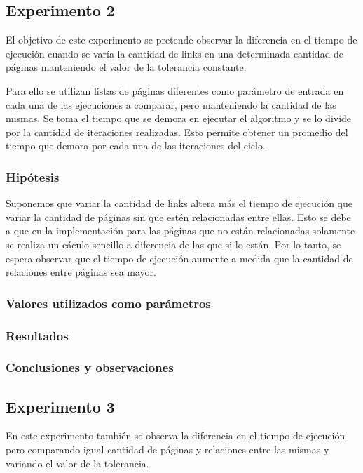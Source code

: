 	\subsection{Experimento 2}
	El objetivo de este experimento se pretende observar la diferencia en el tiempo de ejecución cuando se varía la cantidad de links en una determinada cantidad de páginas manteniendo el valor de la tolerancia constante.

	Para ello se utilizan listas de páginas diferentes como parámetro de entrada en cada una de las ejecuciones a comparar, pero manteniendo la cantidad de las mismas. Se toma el tiempo que se demora en ejecutar el algoritmo y se lo divide por la cantidad de iteraciones realizadas. Esto permite obtener un promedio del tiempo que demora por cada una de las iteraciones del ciclo. 
	


		\subsubsection*{Hipótesis} 
			Suponemos que variar la cantidad de links altera más el tiempo de ejecución que variar la cantidad de páginas sin que estén relacionadas entre ellas. Esto se debe a que en la implementación para las páginas que no están relacionadas solamente se realiza un cáculo sencillo a diferencia de las que si lo están. Por lo tanto, se espera observar que el tiempo de ejecución aumente a medida que la cantidad de relaciones entre páginas sea mayor. 

		\subsubsection*{Valores utilizados como parámetros} 		

		\subsubsection*{Resultados}

		\subsubsection*{Conclusiones y observaciones} 



	\subsection{Experimento 3}
	En este experimento también se observa la diferencia en el tiempo de ejecución pero comparando igual cantidad de páginas y relaciones entre las mismas y variando el valor de la tolerancia.

